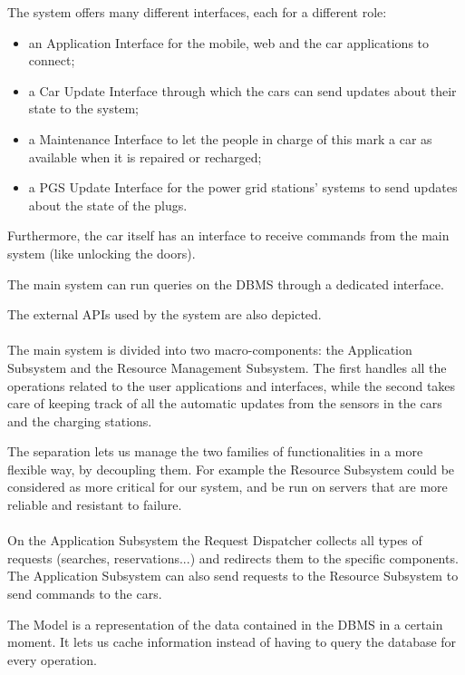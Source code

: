 \documentclass[english]{article}
\begin{document}
\newpage
The system offers many different interfaces, each for a different role:
\begin{itemize}
	\item{an Application Interface for the mobile, web and the car applications to connect;}
	\item{a Car Update Interface through which the cars can send updates about their state to the system;}
	\item{a Maintenance Interface to let the people in charge of this mark a car as available when it is repaired or recharged;}
	\item{a PGS Update Interface for the power grid stations' systems to send updates about the state of the plugs.}
\end{itemize}

Furthermore, the car itself has an interface to receive commands from the main system (like unlocking the doors).

The main system can run queries on the DBMS through a dedicated interface.

The external APIs used by the system are also depicted.

\paragraph{}
The main system is divided into two macro-components: the Application Subsystem and the Resource Management Subsystem.
The first handles all the operations related to the user applications and interfaces, while the second takes care of keeping track of all the automatic updates from the sensors in the cars and the charging stations.

The separation lets us manage the two families of functionalities in a more flexible way, by decoupling them. For example the Resource Subsystem could be considered as more critical for our system, and be run on servers that are more reliable and resistant to failure.

\paragraph{}
On the Application Subsystem the Request Dispatcher collects all types of requests (searches, reservations...) and redirects them to the specific components.
The Application Subsystem can also send requests to the Resource Subsystem to send commands to the cars.

The Model is a representation of the data contained in the DBMS in a certain moment. It lets us cache information instead of having to query the database for every operation.
\end{document}

